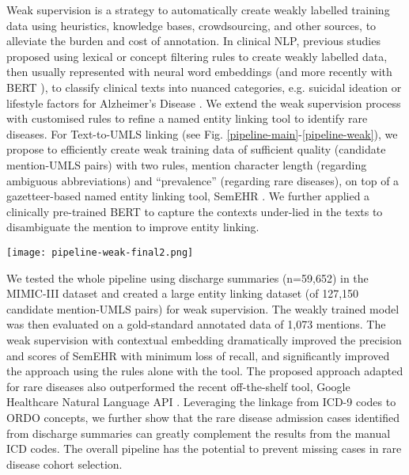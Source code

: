 \documentclass[letterpaper, 10 pt, conference]{ieeeconf}
\begin{document}
Weak supervision \cite{wang_clinical_2019,ratner2019} is a strategy to automatically create weakly labelled training data using heuristics, knowledge bases, crowdsourcing, and other sources, to alleviate the burden and cost of annotation. In clinical NLP, previous studies proposed using lexical or concept filtering rules to create weakly labelled data, then usually represented with neural word embeddings (and more recently with BERT \cite{devlin-etal-2019-bert}), to classify clinical texts \cite{wang_clinical_2019} into nuanced categories, e.g. suicidal ideation \cite{cusick2021} or lifestyle factors for Alzheimer's Disease \cite{shen2021}. We extend the weak supervision process with customised rules to refine a named entity linking tool to identify rare diseases. For Text-to-UMLS linking (see Fig. \ref{pipeline-main}-\ref{pipeline-weak}), we propose to efficiently create weak training data of sufficient quality (candidate mention-UMLS pairs) with two rules, mention character length (regarding ambiguous abbreviations) and ``prevalence'' (regarding rare diseases), on top of a gazetteer-based named entity linking tool, SemEHR \cite{Wu2018semehr}. We further applied a clinically pre-trained BERT \cite{peng2019transfer} to capture the contexts under-lied in the texts to disambiguate the mention to improve entity linking.

\begin{figure*}[ht]
  \centering
  \texttt{[image: pipeline-weak-final2.png]}
  \caption{Weak supervision process for Text-to-UMLS linking. The left four white text boxes displayed the metadata (with examples) of a candidate mention-UMLS pair, identified by SemEHR \cite{Wu2018semehr}; the coloured text boxes in the middle show the contextual representation block (in \colorbox{darkgreen}{\textcolor{white}{green}}) and the rule-based weak data labelling process (in \colorbox{darkblue}{\textcolor{white}{blue}}). A binary label is then generated, which weakly estimates whether the candidate pair indicates a correct phenotype of the patient. A phenotype confirmation model (in \colorbox{mediumgrey}{\textcolor{white}{grey}}) can then be learned to select correct phenotypes from the pairs.}\label{pipeline-weak}
\end{figure*}

We tested the whole pipeline using discharge summaries (n=59,652) in the MIMIC-III dataset \cite{johnson_mimic-iii_2016} and created a large entity linking dataset (of 127,150 candidate mention-UMLS pairs) for weak supervision. The weakly trained model was then evaluated on a gold-standard annotated data of 1,073 mentions. The weak supervision with contextual embedding dramatically improved the precision and  scores of SemEHR with minimum loss of recall, and significantly improved the approach using the rules alone with the tool. The proposed approach adapted for rare diseases also outperformed the recent off-the-shelf tool, Google Healthcare Natural Language API \cite{Bodnari2020}. Leveraging the linkage from ICD-9 codes to ORDO concepts, we further show that the rare disease admission cases identified from discharge summaries can greatly complement the results from the manual ICD codes. The overall pipeline has the potential to prevent missing cases in rare disease cohort selection.
\end{document}
